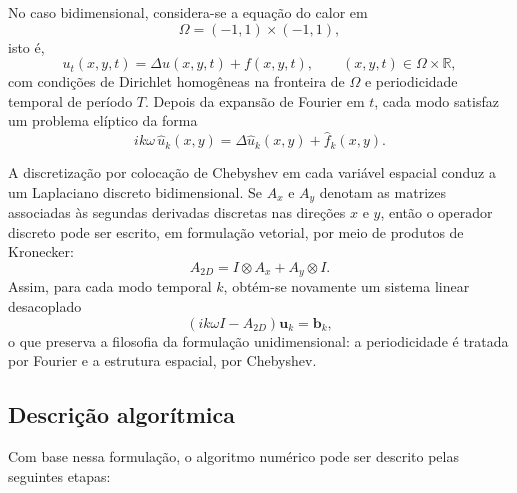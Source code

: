 No caso bidimensional, considera-se a equação do calor em
\[
\Omega=(-1,1)\times(-1,1),
\]
isto é,
\[
u_t(x,y,t)=\Delta u(x,y,t)+f(x,y,t),
\qquad (x,y,t)\in \Omega\times\mathbb{R},
\]
com condições de Dirichlet homogêneas na fronteira de \(\Omega\) e periodicidade temporal de período \(T\). Depois da expansão de Fourier em \(t\), cada modo satisfaz um problema elíptico da forma
\[
ik\omega\,\widehat{u}_k(x,y)=\Delta\widehat{u}_k(x,y)+\widehat{f}_k(x,y).
\]

A discretização por colocação de Chebyshev em cada variável espacial conduz a um Laplaciano discreto bidimensional. Se \(A_x\) e \(A_y\) denotam as matrizes associadas às segundas derivadas discretas nas direções \(x\) e \(y\), então o operador discreto pode ser escrito, em formulação vetorial, por meio de produtos de Kronecker:
\[
A_{2D}=I\otimes A_x + A_y\otimes I.
\]
Assim, para cada modo temporal \(k\), obtém-se novamente um sistema linear desacoplado
\[
\left(ik\omega I-A_{2D}\right)\mathbf{u}_k=\mathbf{b}_k,
\]
o que preserva a filosofia da formulação unidimensional: a periodicidade é tratada por Fourier e a estrutura espacial, por Chebyshev.

\subsection{Descrição algorítmica}

Com base nessa formulação, o algoritmo numérico pode ser descrito pelas seguintes etapas:


